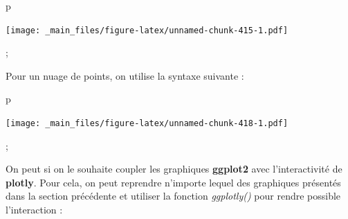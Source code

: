 \documentclass[
]{book}
\newenvironment{Shaded}{\begin{snugshade}}{\end{snugshade}}
\newcommand{\AttributeTok}[1]{\textcolor[rgb]{0.77,0.63,0.00}{#1}}
\newcommand{\FunctionTok}[1]{\textcolor[rgb]{0.00,0.00,0.00}{#1}}
\newcommand{\NormalTok}[1]{#1}
\newcommand{\OtherTok}[1]{\textcolor[rgb]{0.56,0.35,0.01}{#1}}
\newcommand{\SpecialCharTok}[1]{\textcolor[rgb]{0.00,0.00,0.00}{#1}}
\newcommand{\StringTok}[1]{\textcolor[rgb]{0.31,0.60,0.02}{#1}}
\theoremstyle{definition}
\theoremstyle{definition}
\theoremstyle{definition}
\theoremstyle{definition}
\theoremstyle{remark}
\begin{document}
\begin{Shaded}
\begin{Highlighting}[]
\NormalTok{p}
\end{Highlighting}
\end{Shaded}

\texttt{[image: \_main\_files/figure-latex/unnamed-chunk-415-1.pdf]}

;

Pour un nuage de points, on utilise la syntaxe suivante :

\begin{Shaded}
\end{Shaded}

\begin{Shaded}
\begin{Highlighting}[]
\NormalTok{p}
\end{Highlighting}
\end{Shaded}

\texttt{[image: \_main\_files/figure-latex/unnamed-chunk-418-1.pdf]}

;

On peut si on le souhaite coupler les graphiques \textbf{ggplot2} avec l'interactivité de \textbf{plotly}. Pour cela, on peut reprendre n'importe lequel des graphiques présentés dans la section précédente et utiliser la fonction \emph{ggplotly()} pour rendre possible l'interaction :
\end{document}
